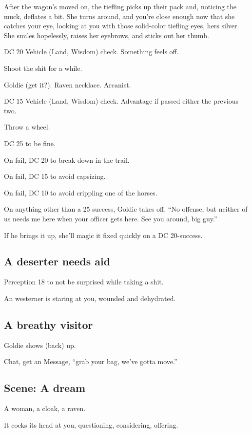 \begin{multicols}{2}
\begin{aloud}
  After the wagon's moved on, the tiefling picks up their pack and, noticing the muck, deflates
    a bit.
  She turns around, and you're close enough now that she catches your eye, looking at you with
    those solid-color tiefling eyes, hers silver.
  She smiles hopelessly, raises her eyebrows, and sticks out her thumb.
  \end{aloud}

DC 20 Vehicle (Land, Wisdom) check.  Something feels off.

Shoot the shit for a while.

Goldie (get it?).
Raven necklace.
Arcanist.

DC 15 Vehicle (Land, Wisdom) check.  Advantage if passed either the previous two.

Throw a wheel.

DC 25 to be fine.

On fail, DC 20 to break down in the trail.

On fail, DC 15 to avoid capsizing.

On fail, DC 10 to avoid crippling one of the horses.

On anything other than a 25 success, Goldie takes off.
``No offense, but neither of us needs me here when your officer gets here.
See you around, big guy.''

If he brings it up, she'll magic it fixed quickly on a DC 20-success.

\subsection{A deserter needs aid}
Perception 18 to not be surprised while taking a shit.

An westerner is staring at you, wounded and dehydrated.

\subsection{A breathy visitor}
Goldie shows (back) up.

Chat, get an Message, ``grab your bag, we've gotta move.''

\subsection{Scene: A dream}

A woman, a cloak, a raven.

It cocks its head at you, questioning, considering, offering.


\end{multicols}
